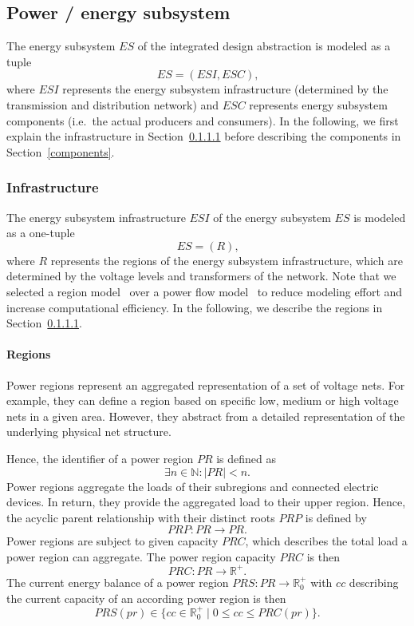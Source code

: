\subsection{Power / energy subsystem}
\label{energy_system}

The energy subsystem $ES$ of the integrated design abstraction is modeled as a tuple
\[
	ES = (ESI, ESC) \textrm{,}
\]
where $ESI$ represents the energy subsystem infrastructure (determined by the transmission and distribution network) and $ESC$ represents energy subsystem components (i.e.\ the actual producers and consumers). In the following, we first explain the infrastructure in Section~\ref{regions} before describing the components in Section~\ref{components}.

\subsubsection{Infrastructure}
\label{energy_infrastructure}

The energy subsystem infrastructure $ESI$ of the energy subsystem $ES$ is modeled as a one-tuple
\[
	ES = (R) \textrm{,}
\]
where $R$ represents the regions of the energy subsystem infrastructure, which are determined by the voltage levels and transformers of the network. Note that we selected a region model~\cite{Hackenberg2012} over a power flow model~ to reduce modeling effort and increase computational efficiency. In the following, we describe the regions in Section~\ref{regions}.

\paragraph{Regions}
\label{regions}

Power regions represent an aggregated representation of a set of voltage nets. For example, they can define a region based on specific low, medium or high voltage nets in a given area. However, they abstract from a detailed representation of the underlying physical net structure.  

Hence, the identifier of a power region $PR$ is defined as
\[
\exists n \in \mathbb{N} : |PR| < n \mathrm{.}
\]
Power regions aggregate the loads of their subregions and connected electric devices. In return, they provide the aggregated load to their upper region.
Hence, the acyclic parent relationship with their distinct roots $PRP$ is defined by 
\[
PRP : PR \to PR \mathrm{.}
\]
Power regions are subject to given capacity $PRC$, which describes the total load a power region can aggregate.
The power region capacity $PRC$ is then
\[
PRC : PR \rightarrow \mathbb{R}^+ \mathrm{.}
\]
The current energy balance of a power region
$PRS : PR \rightarrow \mathbb{R}_0^+$ with $cc$ describing the current capacity of an according power region is then
\[
PRS(pr) \in \{ cc \in \mathbb{R}_0^+ \mid 0 \leq cc \leq PRC(pr) \} \mathrm{.}
\]

